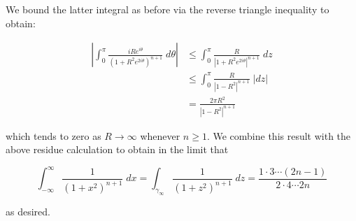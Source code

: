 \begin{solution}
  \pagebreak
  We bound the latter integral as before via the reverse triangle inequality to obtain:

  \begin{align*}
    \left|\int_0^{\pi} { \frac{i R e^{i \theta}}{\left(1 + R^2 e^{2 i \theta}\right)^{n+1}} \; d\theta } \right|
      &\le \int_0^{\pi} { \frac{R}{\left| 1 + R^2 e^{2 i \theta} \right|^{n+1}} \; dz} \\
      &\le \int_0^{\pi} { \frac{R}{\left| 1 - R^2 \right|^{n+1}} \; |dz|} \\
      &= \frac{2 \pi R^2}{\left| 1 - R^2 \right|^{n+1}}
  \end{align*}

  which tends to zero as $R \to \infty$ whenever $n \ge 1$. We combine this result with the above residue calculation to 
  obtain in the limit that 

  $$
    \int_{-\infty}^{\infty} { \frac{1}{(1 + x^2)^{n+1}} \; dx } 
      = \int_{\gamma_{\infty}} { \frac{1}{(1 + z^2)^{n+1}} \; dz } 
      = \frac{1 \cdot 3 \cdots (2n - 1)}{2 \cdot 4 \cdots 2n}
  $$ 

  as desired.

  \ \\
\end{solution}